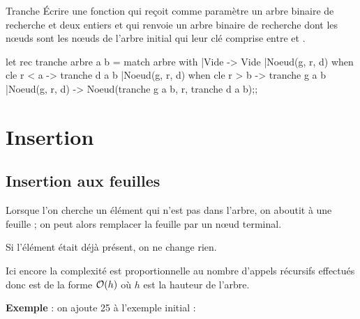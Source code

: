 \begin{exo}{Tranche}{}
Écrire une fonction  qui reçoit comme paramètre un arbre binaire de recherche et deux entiers et qui renvoie un arbre binaire de recherche dont les nœuds sont les nœuds de l'arbre initial qui leur clé  comprise entre  et .
\reponse
\begin{ocaml}
let rec tranche arbre a b = 
  match arbre with
  |Vide -> Vide
  |Noeud(g, r, d) when cle r < a -> tranche d a b
  |Noeud(g, r, d) when cle r > b -> tranche g a b
  |Noeud(g, r, d) -> Noeud(tranche g a b, r, tranche d a b);;
\end{ocaml}
\end{exo}
\section{Insertion}
\subsection{Insertion aux feuilles}
Lorsque l'on cherche un élément qui n'est pas dans l'arbre, on aboutit à une feuille ; on peut alors remplacer la feuille par un nœud terminal.

Si l'élément était déjà présent, on ne change rien.

\medskip

Ici encore la complexité est proportionnelle au nombre d'appels récursifs effectués donc est de la forme ${\cal O}(h)$ où $h$ est la hauteur de l'arbre.

{\bf Exemple} : on ajoute 25 à l'exemple initial :

